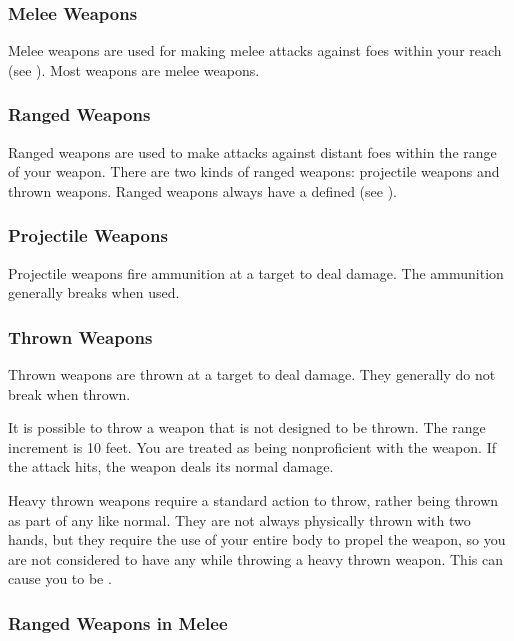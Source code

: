         \subsubsection{Melee Weapons}
            Melee weapons are used for making melee attacks against foes within your reach (see ). Most weapons are melee weapons.

        \subsubsection{Ranged Weapons}
            Ranged weapons are used to make attacks against distant foes within the range of your weapon. There are two kinds of ranged weapons: projectile weapons and thrown weapons.
            Ranged weapons always have a defined  (see ).

            \subsubsection{Projectile Weapons} Projectile weapons fire ammunition at a target to deal damage. The ammunition generally breaks when used.

            \subsubsection{Thrown Weapons}\label{Thrown Weapons} Thrown weapons are thrown at a target to deal damage. They generally do not break when thrown.

                 It is possible to throw a weapon that is not designed to be thrown. The range increment is 10 feet. You are treated as being nonproficient with the weapon. If the attack hits, the weapon deals its normal damage.

                 Heavy thrown weapons require a standard action to throw, rather being thrown as part of any  like normal.
                They are not always physically thrown with two hands, but they require the use of your entire body to propel the weapon, so you are not considered to have any  while throwing a heavy thrown weapon.
                This can cause you to be .

            \subsubsection{Ranged Weapons in Melee}

